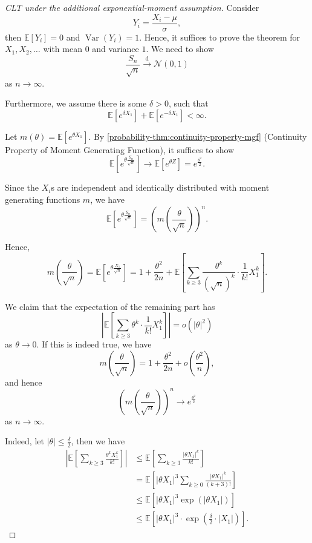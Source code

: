 \documentclass[11pt]{article}
\numberwithin{equation}{section}
\theoremstyle{definition}
\theoremstyle{remark}
\newcommand{\pqty}[1]{\left(#1\right)}
\newcommand{\bqty}[1]{\left[#1\right]}
\newcommand{\abs}[1]{\left|#1\right|}
\newcommand{\flatfrac}[2]{\frac{#1}{#2}}
\newcommand{\littleO}{o}
\newcommand{\Expt}{\mathbb E}
\DeclareMathOperator{\Var}{Var}
\newcommand{\toDist}{\xrightarrow{\mathrm d}}
\newcommand{\Normal}{\mathcal N}
\begin{document}
\begin{proof}[CLT under the additional exponential-moment assumption]\label{probability-proof-093}
    Consider
    \[
        Y_i = \frac{X_i - \mu}{\sigma},
    \]
    then \(\Expt\bqty{Y_i} = 0\) and \(\Var\pqty{Y_i} = 1\). Hence, it suffices to prove the theorem for \(X_1, X_2, \ldots\) with mean \(0\) and variance \(1\). We need to show
    \[
        \frac{S_n}{\sqrt{n}} \toDist \Normal\pqty{0, 1}
    \]
    as \(n \to \infty\).

    Furthermore, we assume there is some \(\delta > 0\), such that
    \[
        \Expt\bqty{e^{\delta X_1}} + \Expt\bqty{e^{- \delta X_1}} < \infty.
    \]

    Let \(m\pqty{\theta} = \Expt\bqty{e^{\theta X_1}}\). By \autoref{probability-thm:continuity-property-mgf} (Continuity Property of Moment Generating Function), it suffices to show
    \[
        \Expt\bqty{e^{\theta \frac{S_n}{\sqrt{n}}}} \to \Expt\bqty{e^{\theta Z}} = e^{\frac{\theta^2}{2}}.
    \]

    Since the \(X_i\)s are independent and identically distributed with moment generating functions \(m\), we have
    \[
        \Expt\bqty{e^{\theta \frac{S_n}{\sqrt{n}}}} = \pqty{m\pqty{\frac{\theta}{\sqrt{n}}}}^{n}.
    \]

    Hence,
    \[
        m\pqty{\frac{\theta}{\sqrt{n}}} = \Expt\bqty{e^{\theta \frac{X_1}{\sqrt{n}}}} = 1 + \frac{\theta^2}{2n} + \Expt\bqty{\sum_{k \geq 3} \frac{\theta^k}{\pqty{\sqrt{n}}^k} \cdot \frac{1}{k!} X_1^k}.
    \]

    We claim that the expectation of the remaining part has
    \[
        \abs{\Expt\bqty{\sum_{k \geq 3} \theta^k \cdot \frac{1}{k!} X_1^k}} = \littleO\pqty{\abs{\theta}^2}
    \]
    as \(\theta \to 0\). If this is indeed true, we have
    \[
        m\pqty{\frac{\theta}{\sqrt{n}}} = 1 + \frac{\theta^2}{2n} + \littleO\pqty{\frac{\theta^2}{n}},
    \]
    and hence
    \[
        \pqty{m \pqty{\frac{\theta}{\sqrt{n}}}}^n \to e^{\flatfrac{\theta^2}{2}}
    \]
    as \(n \to \infty\).

    Indeed, let \(\abs{\theta} \leq \frac{\delta}{2}\), then we have
    \begin{align*}
        \abs{\Expt\bqty{\sum_{k \geq 3} \frac{\theta^k X_1^k}{k!}}} &\leq \Expt\bqty{\sum_{k \geq 3} \frac{\abs{\theta X_1}^k}{k!}} \\
        &= \Expt\bqty{\abs{\theta X_1}^3 \sum_{k \geq 0} \frac{\abs{\theta X_1}^k}{\pqty{k + 3}!}} \\
        &\leq \Expt\bqty{\abs{\theta X_1}^3 \exp\pqty{\abs{\theta X_1}}} \\
        &\leq \Expt\bqty{\abs{\theta X_1}^3 \cdot \exp\pqty{\frac{\delta}{2} \cdot \abs{X_1}}}.
    \end{align*}


\end{proof}
\end{document}
